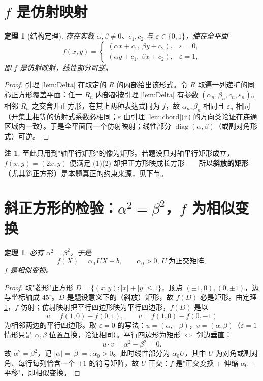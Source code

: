\documentclass[12pt,a4paper]{ctexart}
\theoremstyle{ding}
\newtheorem{satz}[lemma]{定理}
\theoremstyle{definition}
\newtheorem{bem}[lemma]{注}
\begin{document}
\section{$f$ 是仿射映射}
\begin{satz}[结构定理]\label{satz:aff}
存在实数 $\alpha,\beta\neq0$、$c_1,c_2$ 与 $\varepsilon\in\{0,1\}$，使在全平面
\[
f(x,y)=\begin{cases}(\alpha x+c_1,\ \beta y+c_2),&\varepsilon=0,\\[2pt]
(\alpha y+c_1,\ \beta x+c_2),&\varepsilon=1,\end{cases}
\]
即 $f$ 是仿射映射，线性部分可逆。
\end{satz}
\begin{proof}
引理 \ref{lem:Delta} 在取定的 $R$ 的内部给出该形式。令 $R$ 取遍一列递扩的同心正方形覆盖平面：任一 $R_n$ 内部都按引理 \ref{lem:Delta} 有参数 $(\alpha_n,\beta_n,c_n,\varepsilon_n)$。相邻 $R_n$ 之交含开正方形，在其上两种表达式同为 $f$，故 $\alpha_n,\beta_n$ 相同且 $\varepsilon_n$ 相同（开集上相等的仿射式系数必相同；$\varepsilon$ 由引理 \ref{lem:chord}(ii) 的方向类论证在连通区域内一致）。于是全平面同一个仿射映射；线性部分 $\operatorname{diag}(\alpha,\beta)$（或副对角形式）可逆。
\end{proof}

\begin{bem}
至此只用到"轴平行矩形"的像为矩形。若题设只对轴平行矩形成立，$f(x,y)=(2x,y)$ 便满足 (1)(2) 却把正方形映成长方形——所以\textbf{斜放的矩形}（尤其斜正方形）是本题真正的约束来源，见下节。
\end{bem}

\section{斜正方形的检验：$\alpha^2=\beta^2$，$f$ 为相似变换}
\begin{satz}\label{sat:sim}
必有 $\alpha^{2}=\beta^{2}$。于是
\[
f(X)=\alpha_0\,U X+b,\qquad \alpha_0>0,\ U\ \text{为正交矩阵},
\]
$f$ 是相似变换。
\end{satz}
\begin{proof}
取"菱形"正方形 $D=\{(x,y):|x|+|y|\le1\}$，顶点 $(\pm1,0),(0,\pm1)$，边与坐标轴成 $45^\circ$。$D$ 是题设意义下的（斜放）矩形，故 $f(D)$ 必是矩形。由定理 \ref{satz:aff}，$f$ 仿射；仿射映射把平行四边形映为平行四边形，$f(D)$ 是以
\[
u=f(1,0)-f(0,1),\qquad v=f(1,0)-f(0,-1)
\]
为相邻两边的平行四边形。取 $\varepsilon=0$ 的写法：$u=(\alpha,-\beta)$，$v=(\alpha,\beta)$（$\varepsilon=1$ 情形只是 $\alpha,\beta$ 位置互换，论证相同）。平行四边形为矩形 $\iff$ 邻边垂直：
\[
u\cdot v=\alpha^{2}-\beta^{2}=0 .
\]
故 $\alpha^2=\beta^2$，记 $|\alpha|=|\beta|=:\alpha_0>0$。此时线性部分为 $\alpha_0 U$，其中 $U$ 为对角或副对角、每行每列恰含一个 $\pm1$ 的符号矩阵，故 $U$ 正交：$f$ 是"正交变换 + 伸缩 $\alpha_0$ + 平移"，即相似变换。
\end{proof}
\end{document}
